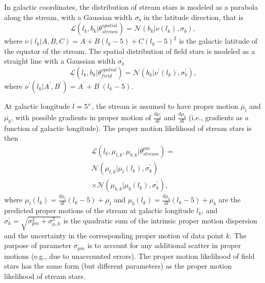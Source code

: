 \documentclass[iop]{emulateapj}
\begin{document}
In galactic coordinates, the distribution of stream stars is modeled as a
parabola along the stream, with a Gaussian width $\sigma_b$ in the latitude
direction, that is
\begin{equation}
    \mathcal{L}(l_k, b_k | \theta^{spatial}_{stream}) = \mathcal{N}(b_k | \nu(l_k), \sigma_b),
\end{equation}
where $\nu(l_k | A, B, C)=A + B(l_k-5) + C(l_k-5)^2$ is the galactic latitude of
the equator of the stream. The spatial distribution of field stars is modeled as
a straight line with a Gaussian width $\sigma^\prime_b$
\begin{equation}
    \mathcal{L}(l_k, b_k | \theta^{spatial}_{field}) = \mathcal{N}(b_k | \nu^\prime(l_k), \sigma^\prime_b),
\end{equation}
where $\nu^\prime(l_k | A^\prime, B^\prime)=A^\prime + B^\prime(l_k-5)$.

At galactic longitude $l=5\mbox{$^\circ$}$, the stream is assumed to have proper motion
$\overline{\mu_l}$ and $\overline{\mu_b}$, with possible gradients in proper
motion of $\frac{d\mu_l}{dl}$ and $\frac{d\mu_b}{dl}$ (i.e., gradients as a
function of galactic longitude). The proper motion likelihood of stream stars is
then
\begin{equation}
\begin{split}
\mathcal{L}(l_k,\mu_{l,k},\mu_{b,k}|\theta^{pm}_{stream})= \\
\mathcal{N}(\mu_{l,k}| \mu_l(l_k), \sigma^\prime_k) \\
\times\mathcal{N}(\mu_{b,k}| \mu_b(l_k), \sigma^\prime_k),
\end{split}
\end{equation}
where $\mu_l(l_k)=\frac{d\mu_l}{dl}\left(l_k-5\right) + \overline{\mu_l}$ and
$\mu_b(l_k)=\frac{d\mu_b}{dl}\left(l_k-5\right) + \overline{\mu_b}$ are the
predicted proper motions of the stream at galactic longitude $l_k$, and
$\sigma^\prime_k = \sqrt{\sigma_{pm}^2 + \sigma^2_{\mu,k}}$ is the quadratic sum
of the intrinsic proper motion dispersion and the uncertainty in the
corresponding proper motion of data point $k$. The purpose of parameter
$\sigma_{pm}$ is to account for any additional scatter in proper motions (e.g., 
due to unaccounted errors). The proper motion likelihood of field stars has the
same form (but different parameters) as the proper motion likelihood of stream
stars.
\end{document}
